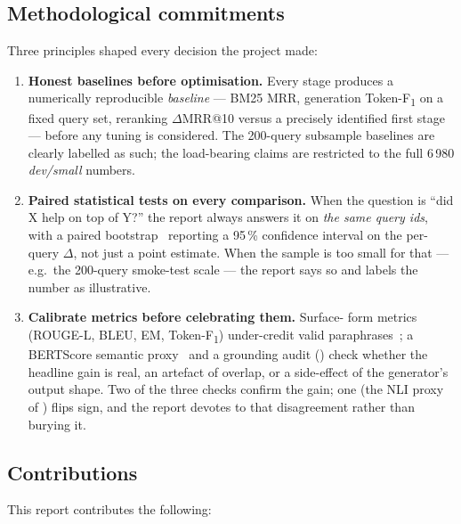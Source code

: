\documentclass[11pt,a4paper]{article}
\makeatletter
\newcommand{\devsmall}{\textit{dev/small}}
\newcommand{\fdev}{6\,980}
\newcommand{\F}{F\textsubscript{1}}
\newcommand{\Tokenf}{Token-\F}
\newcommand{\rougel}{ROUGE-L}
\newcommand{\mrr}{MRR@10}
\newcommand{\bmtwofive}{BM25}
\makeatother
\begin{document}
\subsection{Methodological commitments}

Three principles shaped every decision the project made:

\begin{enumerate}
  \item \textbf{Honest baselines before optimisation.}  Every stage
        produces a numerically reproducible \emph{baseline} ---
        \bmtwofive{} MRR, generation \Tokenf{} on a fixed query set,
        reranking $\Delta$\mrr{} versus a precisely identified first
        stage --- before any tuning is considered.  The 200-query
        subsample baselines are clearly labelled as such; the
        load-bearing claims are restricted to the full \fdev{}
        \devsmall{} numbers.
  \item \textbf{Paired statistical tests on every comparison.}  When
        the question is ``did X help on top of Y?'' the report
        always answers it on \emph{the same query ids}, with a paired
        bootstrap~\cite{koehn2004bootstrap} reporting a 95\,\%
        confidence interval on the per-query $\Delta$, not just a
        point estimate.  When the sample is too small for that ---
        e.g.\ the 200-query smoke-test scale --- the report says so
        and labels the number as illustrative.
  \item \textbf{Calibrate metrics before celebrating them.}  Surface-
        form metrics (\rougel{}, BLEU, EM, \Tokenf{}) under-credit
        valid paraphrases~\cite{lin2004rouge,papineni2002bleu}; a
        BERTScore semantic proxy~\cite{zhang2020bertscore} and a
        grounding audit () check whether the headline
        gain is real, an artefact of overlap, or a side-effect of
        the generator's output shape.  Two of the three checks
        confirm the gain; one (the NLI proxy of )
        flips sign, and the report devotes
         to that disagreement rather
        than burying it.
\end{enumerate}

\subsection{Contributions}

This report contributes the following:
\end{document}
